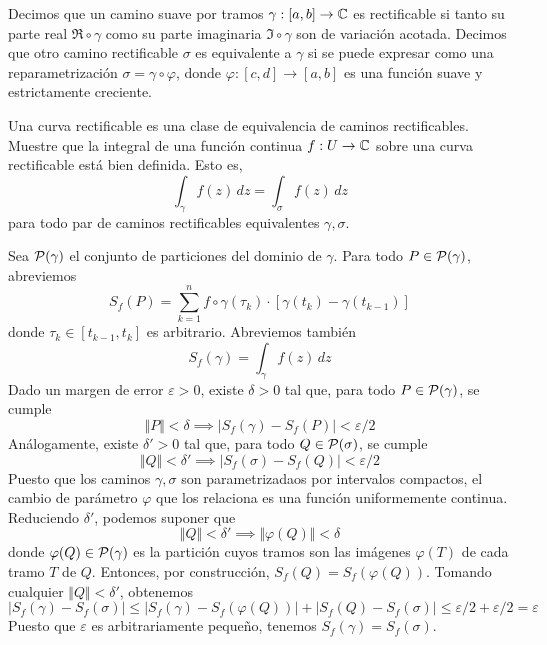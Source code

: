 \begin{exercise}
Decimos que un camino suave por tramos $\gamma : [a,b] \to \C$ es rectificable si tanto su parte real $\Re \circ \gamma$ como su parte imaginaria $\Im \circ \gamma$ son de variación acotada. Decimos que otro camino rectificable $\sigma$ es equivalente a $\gamma$ si se puede expresar como una reparametrización $\sigma = \gamma \circ \varphi$, donde $\varphi : [c,d] \to [a,b]$ es una función suave y estrictamente creciente.

Una curva rectificable es una clase de equivalencia de caminos rectificables. Muestre que la integral de una función continua $f : U \to \C$ sobre una curva rectificable está bien definida. Esto es,
$$\int_\gamma f(z) \, dz = \int_\sigma f(z) \, dz$$
para todo par de caminos rectificables equivalentes $\gamma, \sigma$.
\end{exercise}

\begin{solution}
Sea $\P(\gamma)$ el conjunto de particiones del dominio de $\gamma$. Para todo $P \in \P(\gamma)$, abreviemos
$$S_f(P) = \sum_{k=1}^n f \circ \gamma(\tau_k) \cdot [\gamma(t_k) - \gamma(t_{k-1})]$$
donde $\tau_k \in [t_{k-1}, t_k]$ es arbitrario. Abreviemos también
$$S_f(\gamma) = \int_\gamma f(z) \, dz$$
Dado un margen de error $\varepsilon > 0$, existe $\delta > 0$ tal que, para todo $P \in \P(\gamma)$, se cumple
$$\Vert P \Vert < \delta \implies |S_f(\gamma) - S_f(P)| < \varepsilon/2$$
Análogamente, existe $\delta' > 0$ tal que, para todo $Q \in \P(\sigma)$, se cumple
$$\Vert Q \Vert < \delta' \implies |S_f(\sigma) - S_f(Q)| < \varepsilon/2$$
Puesto que los caminos $\gamma, \sigma$ son parametrizadaos por intervalos compactos, el cambio de parámetro $\varphi$ que los relaciona es una función uniformemente continua. Reduciendo $\delta'$, podemos suponer que
$$\Vert Q \Vert < \delta' \implies \Vert \varphi(Q) \Vert < \delta$$
donde $\varphi(Q) \in \P(\gamma)$ es la partición cuyos tramos son las imágenes $\varphi(T)$ de cada tramo $T$ de $Q$. Entonces, por construcción, $S_f(Q) = S_f(\varphi(Q))$. Tomando cualquier $\Vert Q \Vert < \delta'$, obtenemos
$$
|S_f(\gamma) - S_f(\sigma)|
    \le |S_f(\gamma) - S_f(\varphi(Q))| + |S_f(Q) - S_f(\sigma)|
    \le \varepsilon/2 + \varepsilon/2
    = \varepsilon
$$
Puesto que $\varepsilon$ es arbitrariamente pequeño, tenemos $S_f(\gamma) = S_f(\sigma)$.
\end{solution}

